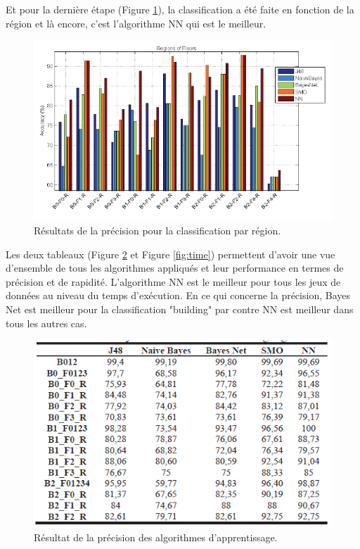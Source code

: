 Et pour la dernière étape (Figure \ref{fig:regionClass}), la classification a été faite en fonction de la région et là encore, c'est l'algorithme NN qui est le meilleur.

\begin{figure}[htp]
 \begin{center}
  \includegraphics[scale=0.6]{figures/regionClassification.png}
  \caption{Résultats de la précision pour la classification par région. \cite{ML_algo}}
  \label{fig:regionClass} %
 \end{center}
\end{figure}

Les deux tableaux (Figure \ref{fig:accuracy} et Figure \ref{fig:time}) permettent d'avoir une vue d'ensemble de tous les algorithmes appliqués et leur performance en termes de précision et de rapidité. L'algorithme NN est le meilleur pour tous les jeux de données au niveau du temps d'exécution. En ce qui concerne la précision, Bayes Net est meilleur pour la classification "building" par contre NN est meilleur dans tous les autres cas.

\begin{figure}[htp]
 \begin{center}
  \includegraphics[scale=1]{figures/accuracy.png}
  \caption{Résultat de la précision des algorithmes d'apprentissage.\cite{ML_algo}}
  \label{fig:accuracy} %
 \end{center}
\end{figure}

